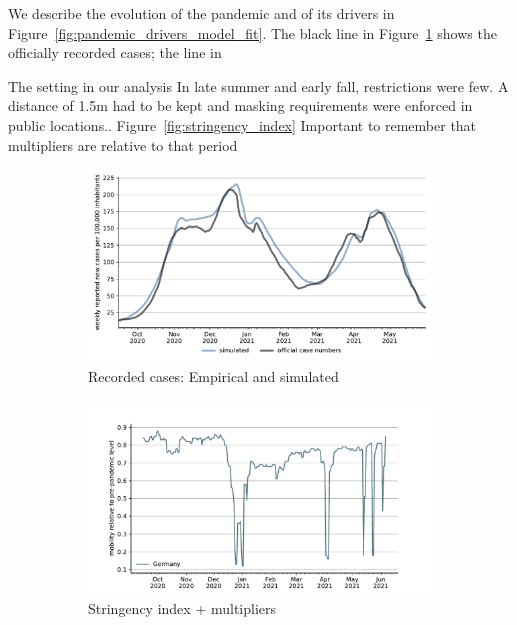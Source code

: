 We describe the evolution of the pandemic and of its drivers in Figure~\ref{fig:pandemic_drivers_model_fit}. The black line in Figure~\ref{fig:aggregated_fit} shows the officially recorded cases; the  line in 


The setting in our analysis 
In late summer and early fall, restrictions were few. A distance of 1.5m had to be kept and masking requirements were enforced in public locations.. 
 Figure~\ref{fig:stringency_index} Important to remember that multipliers are relative to that period

\begin{figure}[!tp]
    \centering
    
    \begin{subfigure}[b]{0.475\textwidth}
        \centering

        \includegraphics[width=\textwidth]{../figures/results/figures/scenario_comparisons/combined_fit/full_new_known_case}
        \caption{{\small Recorded cases: Empirical and simulated}}
        \label{fig:aggregated_fit}
    \end{subfigure}
    \hfill
    \begin{subfigure}[b]{0.475\textwidth}
        \centering
        \includegraphics[width=\textwidth]{../figures/results/figures/data/work_multiplier_since_sep}
        Stringency index + multipliers


\end{subfigure}
\end{figure}
